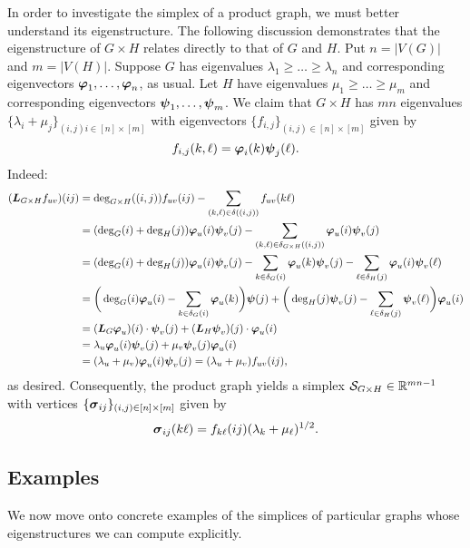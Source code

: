 In order to investigate the simplex of a product graph, we must better understand its eigenstructure. The following discussion demonstrates that the eigenstructure of $G\times H$ relates directly to that of $G$ and $H$. Put $n=|V(G)|$ and $m=|V(H)|$. Suppose $G$ has eigenvalues $\lambda_1\geq \dots\geq \lambda_{n}$ and corresponding eigenvectors $\vb*{\varphi}_1,\dots,\vb*{\varphi}_{n}$, as usual. Let $H$ have eigenvalues $\mu_1\geq \dots\geq \mu_{m}$ and corresponding eigenvectors $\vb*{\psi}_1,\dots,\vb*{\psi}_{m}$. 
We claim that $G\times H$ has $mn$ eigenvalues $\{\lambda_i+\mu_j\}_{(i,j)i\in[n]\times[m]}$ with eigenvectors $\{f_{i,j}\}_{(i,j)\in[n]\times[m]}$ given by 
\[f_{i,j}(k,\ell) = \vb*{\varphi}_i(k)\vb*{\psi}_j(\ell).\]
Indeed: 
\begin{align*}
(\vb*{L}_{G\times H} f_{uv})(ij) &= \deg_{G\times H}((i,j))f_{uv}(ij) - \sum_{(k,\ell)\in \delta((i,j))} f_{uv}(k\ell) \\
&= (\deg_G(i)+\deg_H(j))\vb*{\varphi}_u(i)\vb*{\psi}_v(j) - \sum_{(k,\ell)\in \delta_{G\times H}((i,j))} \vb*{\varphi}_u(i)\vb*{\psi}_v(j) \\
&= (\deg_G(i)+\deg_H(j))\vb*{\varphi}_u(i)\vb*{\psi}_v(j) - \sum_{k\in \delta_G(i)} \vb*{\varphi}_u(k)\vb*{\psi}_v(j) - \sum_{\ell\in \delta_H(j)} \vb*{\varphi}_u(i)\vb*{\psi}_v(\ell) \\
&=\bigg(\deg_G(i)\vb*{\varphi}_u(i) - \sum_{k\in\delta_G(i)}\vb*{\varphi}_u(k)\bigg)\vb*{\psi}(j) + \bigg(\deg_H(j)\vb*{\psi}_v(j)-\sum_{\ell\in\delta_H(j)}\vb*{\psi}_v(\ell)\bigg)\vb*{\varphi}_u(i) \\
&= (\vb*{L}_G \vb*{\varphi}_u)(i) \cdot \vb*{\psi}_v(j) + (\vb*{L}_H\vb*{\psi}_v)(j)\cdot \vb*{\varphi}_u(i) \\
&= \lambda_u\vb*{\varphi}_u(i) \vb*{\psi}_v(j) + \mu_v\vb*{\psi}_v(j)\vb*{\varphi}_u(i) \\
&= (\lambda_u+\mu_v)\vb*{\varphi}_u(i)\vb*{\psi}_v(j) = (\lambda_u+\mu_v)f_{uv}(ij),
\end{align*}
as desired. Consequently, the product graph yields a simplex $\mathcal{S}_{G\times H}\in\mathbb{R}^{mn-1}$ with vertices $\{\vb*{\sigma}_{ij}\}_{(i,j)\in[n]\times[m]}$ given by 
\[\vb*{\sigma}_{ij}(k\ell)=f_{k\ell}(ij)(\lambda_k+\mu_\ell)^{1/2}.\]


\subsection{Examples}
\label{sec:examples}

We now move onto concrete examples of the simplices of particular graphs whose eigenstructures we can compute explicitly. 

